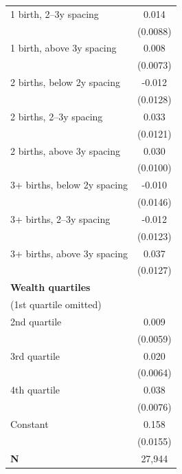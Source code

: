 {\begin{tabular}{l*{1}{c}}
\addlinespace
\hspace*{1em}1 birth, 2–3y spacing&       0.014         \\
                    &    (0.0088)         \\
\addlinespace
\hspace*{1em}1 birth, above 3y spacing&       0.008         \\
                    &    (0.0073)         \\
\addlinespace
\hspace*{1em}2 births, below 2y spacing&      -0.012         \\
                    &    (0.0128)         \\
\addlinespace
\hspace*{1em}2 births, 2–3y spacing&       0.033\sym{**} \\
                    &    (0.0121)         \\
\addlinespace
\hspace*{1em}2 births, above 3y spacing&       0.030\sym{**} \\
                    &    (0.0100)         \\
\addlinespace
\hspace*{1em}3+ births, below 2y spacing&      -0.010         \\
                    &    (0.0146)         \\
\addlinespace
\hspace*{1em}3+ births, 2–3y spacing&      -0.012         \\
                    &    (0.0123)         \\
\addlinespace
\hspace*{1em}3+ births, above 3y spacing&       0.037\sym{**} \\
                    &    (0.0127)         \\
\addlinespace
\textbf{Wealth quartiles} \\ (1st quartile omitted)&                     \\
\addlinespace
\hspace*{1em}2nd quartile        &       0.009         \\
                    &    (0.0059)         \\
\addlinespace
\hspace*{1em}3rd quartile        &       0.020\sym{**} \\
                    &    (0.0064)         \\
\addlinespace
\hspace*{1em}4th quartile        &       0.038\sym{***}\\
                    &    (0.0076)         \\
\addlinespace
\hspace*{1em}Constant            &       0.158\sym{***}\\
                    &    (0.0155)         \\
\midrule
\textbf{N}          &      27,944         \\
\bottomrule
\end{tabular}
}

